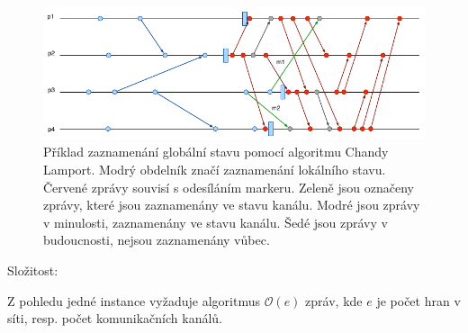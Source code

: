 \begin{compactitem}
    \begin{figure}[H]
        \centering
        \includegraphics[width=1\linewidth]{chandy_lamport_example.pdf}
        \caption{Příklad zaznamenání globální stavu pomocí algoritmu Chandy Lamport. Modrý obdelník značí zaznamenání lokálního stavu. Červené zprávy souvisí s odesíláním markeru. Zeleně jsou označeny zprávy, které jsou zaznamenány ve stavu kanálu. Modré jsou zprávy v minulosti, zaznamenány ve stavu kanálu. Šedé jsou zprávy v budoucnosti, nejsou zaznamenány vůbec.}
    \end{figure}

    \item Složitost: \begin{compactitem}
        \item Z pohledu jedné instance vyžaduje algoritmus $\mathcal{O}(e)$ zpráv, kde $e$ je počet hran v síti, resp. počet komunikačních kanálů.
    \end{compactitem}
\end{compactitem}
